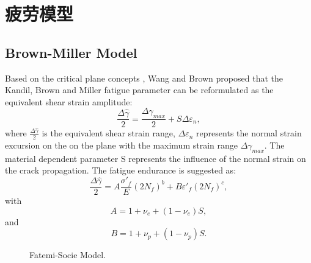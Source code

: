 \documentclass{article}
\begin{document}
\section{疲劳模型}

\subsection{Brown-Miller Model}
Based on the critical plane concepts \cite{Brown1973}, Wang and Brown \cite{Wang1993} proposed that the Kandil, Brown and Miller fatigue parameter \cite{Kandil1982} can be reformulated as the equivalent shear strain amplitude:
\begin{equation}
\frac{{\Delta \hat \gamma }}{2} = \frac{{\Delta {\gamma _{max}}}}{2} + S\Delta {\varepsilon _n},
\label{Equ:ShearStrainBM}
\end{equation}
where $\frac{{\Delta \hat \gamma }}{2}$ is the equivalent shear strain range, $\Delta {\varepsilon _n}$ represents the normal strain excursion on the on the plane with the maximum strain range $\Delta {\gamma _{max}}$. The material dependent parameter S represents the influence of the normal strain on the crack propagation.
The fatigue endurance is suggested as:
\begin{equation}
\frac{{\Delta \hat \gamma }}{2} = A\frac{{{{\sigma '}_f}}}{E}{\left( {2{N_f}} \right)^b} + B{{\varepsilon '}_f}{\left( {2{N_f}} \right)^c},
\end{equation}
with
\[A = 1 + {\nu _e} + \left( {1 - {\nu _e}} \right)S,\]
and
\[B = 1 + {\nu _p} + \left( {1 - {\nu _p}} \right)S.\]

\begin{figure}[!htp]
\caption{Fatemi-Socie Model.}
\label{Fig:NF-NP-TGMF-BM}
\end{figure}
\end{document}
